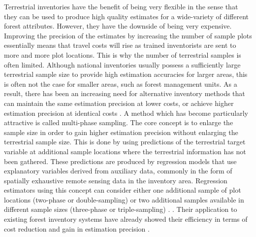 Terrestrial inventories have the benefit of being very flexible in the sense that they can be used to produce high quality estimates for a wide-variety of different forest attributes. However, they have the downside of being very expensive.  Improving the precision of the estimates by increasing the number of sample plots essentially means that travel costs will rise as trained inventorists are sent to more and more plot locations. This is why the number of terrestrial samples is often limited. Although national inventories usually possess a sufficiently large terrestrial sample size to provide high estimation accuracies for larger areas, this is often not the case for smaller areas, such as forest management units.  As a result, there has been an increasing need for alternative inventory methods that can maintain the same estimation precision at lower costs, or achieve higher estimation precision at identical costs \citep{vonluepke2013}. A method which has become particularly attractive is called multi-phase sampling. The core concept is to enlarge the sample size in order to gain higher estimation precision without enlarging the terrestrial sample size. This is done by using predictions of the terrestrial target variable at additional sample locations where the terrestrial information has not been gathered. These predictions are produced by regression models that use explanatory variables derived from auxiliary data, commonly in the form of spatially exhaustive remote sensing data in the inventory area. Regression estimators using this concept can consider either one additional sample of plot locations (two-phase or double-sampling) or two additional samples available in different sample sizes (three-phase or triple-sampling) \citep{gregoire2007, saborowski2010,  mandallaz2013a, mandallaz2013c, vonLuepke2012}. \citep{gregoire2007, saborowski2010, mandallaz2013a, mandallaz2013c, vonLuepke2012}. Their application to existing forest inventory systems have already showed their efficiency in terms of cost reduction and gain in estimation precision \citep{breidenbach2012, vonLuebke2014, mandallaz2013b, magnussen2014, massey2014a}.\par

